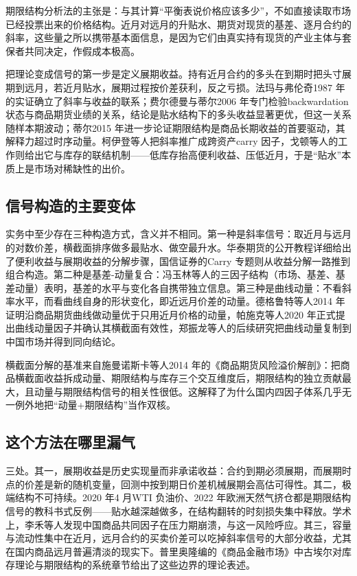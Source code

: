 \documentclass[12pt,a4paper]{ctexart}
\begin{document}
期限结构分析法的主张是：与其计算“平衡表说价格应该多少”，不如直接读取市场已经投票出来的价格结构。近月对远月的升贴水、期货对现货的基差、逐月合约的斜率，这些量之所以携带基本面信息，是因为它们由真实持有现货的产业主体与套保者共同决定，作假成本极高。

把理论变成信号的第一步是定义展期收益。持有近月合约的多头在到期时把头寸展期到远月，若近月贴水，展期过程按价差获利，反之亏损。法玛与弗伦奇1987 年的实证确立了斜率与收益的联系\cite{08}；费尔德曼与蒂尔2006 年专门检验backwardation 状态与商品期货业绩的关系，结论是贴水结构下的多头收益显著更优，但这一关系随样本期波动\cite{36}；蒂尔2015 年进一步论证期限结构是商品长期收益的首要驱动，其解释力超过时序动量\cite{35}。柯伊登等人把斜率推广成跨资产carry 因子\cite{13}，戈顿等人的工作则给出它与库存的联结机制\cite{12}——低库存抬高便利收益、压低近月，于是“贴水”本质上是市场对稀缺性的出价。

\subsection{信号构造的主要变体}

实务中至少存在三种构造方式，含义并不相同。第一种是斜率信号：取近月与远月的对数价差，横截面排序做多最贴水、做空最升水。华泰期货的公开教程详细给出了便利收益与展期收益的分解步骤\cite{57}，国信证券的Carry 专题则从收益分解一路推到组合构造\cite{61}。第二种是基差-动量复合：冯玉林等人的三因子结构（市场、基差、基差动量）表明，基差的水平与变化各自携带独立信息\cite{87}。第三种是曲线动量：不看斜率水平，而看曲线自身的形状变化，即近远月价差的动量。德格鲁特等人2014 年证明沿商品期货曲线做动量优于只用近月价格的动量\cite{33}，帕施克等人2020 年正式提出曲线动量因子并确认其横截面有效性\cite{34}，郑振龙等人的后续研究把曲线动量复制到中国市场并得到同向结论\cite{90}。

横截面分解的基准来自施曼诺斯卡等人2014 年的《商品期货风险溢价解剖》：把商品横截面收益拆成动量、期限结构与库存三个交互维度后，期限结构的独立贡献最大，且动量与期限结构信号的相关性很低\cite{28}。这解释了为什么国内四因子体系几乎无一例外地把“动量+期限结构”当作双核\cite{59, 60}。

\subsection{这个方法在哪里漏气}

三处。其一，展期收益是历史实现量而非承诺收益：合约到期必须展期，而展期时点的价差是新的随机变量，回测中按到期日价差机械展期会高估可得性。其二，极端结构不可持续。2020 年4 月WTI 负油价、2022 年欧洲天然气挤仓都是期限结构信号的教科书式反例——贴水越深越做多，在结构翻转的时刻损失集中释放。学术上，李禾等人发现中国商品共同因子在压力期崩溃\cite{89}，与这一风险呼应。其三，容量与流动性集中在近月，远月合约的买卖价差可以吃掉斜率信号的大部分收益，尤其在国内商品远月普遍清淡的现实下。普里奥隆编的《商品金融市场》中古埃尔对库存理论与期限结构的系统章节给出了这些边界的理论表述\cite{48}。
\end{document}
